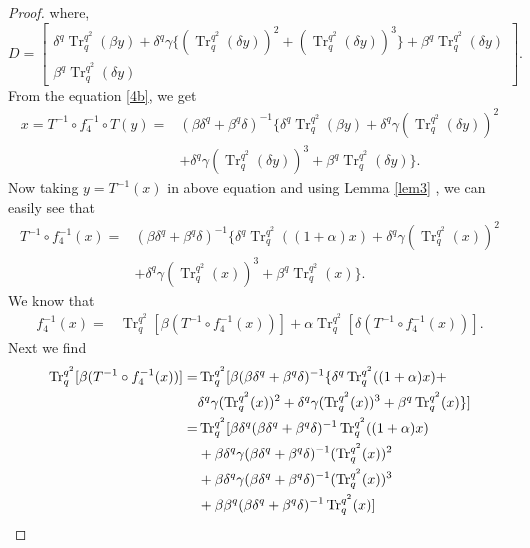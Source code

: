 \documentclass{birkjour}
\theoremstyle{definition}
\theoremstyle{remark}
\numberwithin{equation}{section}
\begin{document}
\begin{proof}
where,
$$D=
\begin{bmatrix}
	\delta^{q}\operatorname{Tr}_{q}^{q^2}(\beta y)+\delta^{q}\gamma\{(\operatorname{Tr}_{q}^{q^2}(\delta y))^2+(\operatorname{Tr}_{q}^{q^2}(\delta y))^3\}+\beta^{q}\operatorname{Tr}_{q}^{q^2}(\delta y)\\
	\beta^{q}\operatorname{Tr}_{q}^{q^2}(\delta y)
\end{bmatrix}.$$
From the equation \ref{4b}, we get
\begin{align*}
x=T^{-1}\circ f_4^{-1}\circ T(y)=&(\beta\delta^{q}+\beta^{q}\delta)^{-1}\{\delta^{q}\operatorname{Tr}_{q}^{q^2}(\beta y)+\delta^{q}\gamma(\operatorname{Tr}_{q}^{q^2}(\delta y))^2\\&+\delta^{q}\gamma(\operatorname{Tr}_{q}^{q^2}(\delta y))^3+\beta^{q}\operatorname{Tr}_{q}^{q^2}(\delta y)\}.
\end{align*}
Now taking $y=T^{-1}(x)$ in above equation and using Lemma \ref{lem3} , we can easily see that 
\begin{align*}
	T^{-1}\circ f_4^{-1}(x)=&(\beta\delta^{q}+\beta^{q}\delta)^{-1}\{\delta^{q}\operatorname{Tr}_{q}^{q^2}((1+\alpha)x)+\delta^{q}\gamma(\operatorname{Tr}_{q}^{q^2}(x))^2\\&+\delta^{q}\gamma(\operatorname{Tr}_{q}^{q^2}(x))^3+\beta^{q}\operatorname{Tr}_{q}^{q^2}(x)\}.
\end{align*}
We know that
\begin{align}
	f_4^{-1}(x)=&\operatorname{Tr}_{q}^{q^2}[\beta (T^{-1}\circ f_4^{-1}(x))]+\alpha\operatorname{Tr}_{q}^{q^2}[\delta (T^{-1}\circ f_4^{-1}(x))].\label{4c}
\end{align}
Next we find
\begin{align}
	\operatorname{Tr}_{q}^{q^2}[\beta (T^{-1}\circ f_4^{-1}(x))]=&\operatorname{Tr}_{q}^{q^2}[\beta (\beta\delta^{q}+\beta^{q}\delta)^{-1}\{\delta^{q}\operatorname{Tr}_{q}^{q^2}((1+\alpha)x)+\notag\\&\delta^{q}\gamma(\operatorname{Tr}_{q}^{q^2}(x))^2+\delta^{q}\gamma(\operatorname{Tr}_{q}^{q^2}(x))^3+\beta^{q}\operatorname{Tr}_{q}^{q^2}(x)\}]\notag\\
	=&\operatorname{Tr}_{q}^{q^2}[\beta\delta^{q}(\beta\delta^{q}+\beta^{q}\delta)^{-1}\operatorname{Tr}_{q}^{q^2}((1+\alpha)x)\notag\\&+\beta\delta^{q}\gamma(\beta\delta^{q}+\beta^{q}\delta)^{-1}(\operatorname{Tr}_{q}^{q^2}(x))^2\notag\\&+\beta\delta^{q}\gamma(\beta\delta^{q}+\beta^{q}\delta)^{-1}(\operatorname{Tr}_{q}^{q^2}(x))^3\notag\\&+\beta\beta^{q}(\beta\delta^{q}+\beta^{q}\delta)^{-1}\operatorname{Tr}_{q}^{q^2}(x)]\notag\\

\end{align}
\end{proof}
\end{document}
